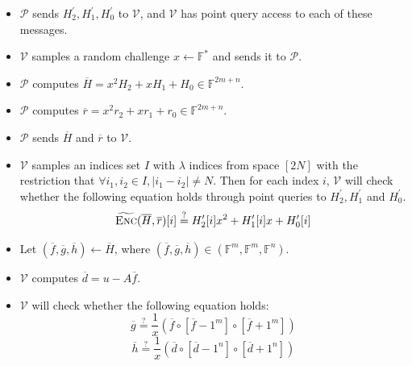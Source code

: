 \begin{itemize}
    \item $\mathcal{P}$ sends $H_2^\prime, H_1^\prime, H_0^\prime$ to $\mathcal{V}$, and $\mathcal{V}$ has point query access to each of these messages.
    
    \item $\mathcal{V}$ samples a random challenge $x \leftarrow \mathbb{F}^*$ and sends it to $\mathcal{P}$.
    
    \item $\mathcal{P}$ computes $\overline{H} = x^2H_2 + xH_1 + H_0 \in \mathbb{F}^{2m+n}$.
    
    \item $\mathcal{P}$ computes $\overline{r} = x^2r_2 + xr_1 + r_0 \in \mathbb{F}^{2m+n}$.

    \item $\mathcal{P}$ sends $\overline{H}$ and $\overline{r}$ to $\mathcal{V}$.

    \item $\mathcal{V}$ samples an indices set $I$ with $\lambda$ indices from space $[2N]$ with the restriction that $\forall i_1, i_2 \in I, |i_1 - i_2| \neq N$. Then for each index $i$, $\mathcal{V}$ will check whether the following equation holds through point queries to $H_2^\prime, H_1^\prime$ and $H_0^\prime$.
\begin{equation}
\label{eq:lwe5}
    \widetilde{\textsc{Enc}}(\overline{H}, \overline{r})[i] 
    \stackrel{?}{=} 
    H_2^\prime[i] x^2 + H_1^\prime[i] x + H_0^\prime[i]
\end{equation}

    \item Let $(\overline{f}, \overline{g}, \overline{h}) \leftarrow \overline{H}$, where $(\overline{f}, \overline{g}, \overline{h}) \in (\mathbb{F}^m, \mathbb{F}^m, \mathbb{F}^n)$. 
    
    \item $\mathcal{V}$ computes $\overline{d} = u - A\overline{f}$.

    \item $\mathcal{V}$ will check whether the following equation holds:
\begin{equation}
\label{eq:lwe6}
    \overline{g} \overset{?}{=} \frac{1}{x} (\overline{f} \circ [\overline{f} - 1^m] \circ [\overline{f} + 1^m])
\end{equation}
\begin{equation}
\label{eq:lwe7}
    \overline{h} \overset{?}{=} \frac{1}{x} (\overline{d} \circ [\overline{d} - 1^n] \circ [\overline{d} + 1^n])
\end{equation}
    

\end{itemize}

